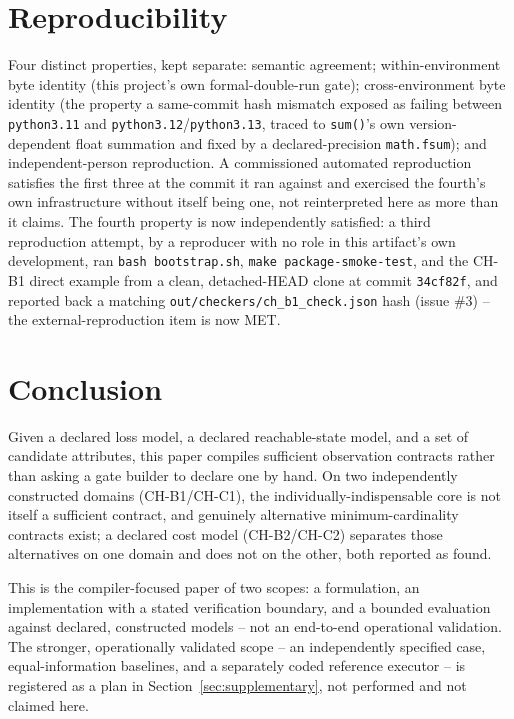 \documentclass[11pt,a4paper]{article}
\theoremstyle{definition}
\begin{document}
\section{Reproducibility}
\label{sec:reproducibility}

Four distinct properties, kept separate: semantic agreement; within-environment byte identity (this project's own formal-double-run gate); cross-environment byte identity (the property a same-commit hash mismatch exposed as failing between \texttt{python3.11} and \texttt{python3.12}/\texttt{python3.13}, traced to \texttt{sum()}'s own version-dependent float summation and fixed by a declared-precision \texttt{math.fsum}); and independent-person reproduction. A commissioned automated reproduction satisfies the first three at the commit it ran against and exercised the fourth's own infrastructure without itself being one, not reinterpreted here as more than it claims. The fourth property is now independently satisfied: a third reproduction attempt, by a reproducer with no role in this artifact's own development, ran \texttt{bash bootstrap.sh}, \texttt{make package-smoke-test}, and the CH-B1 direct example from a clean, detached-HEAD clone at commit \texttt{34cf82f}, and reported back a matching \texttt{out/checkers/ch\_b1\_check.json} hash (issue \#3) -- the external-reproduction item is now MET.

\section{Conclusion}
\label{sec:conclusion}

Given a declared loss model, a declared reachable-state model, and a set of candidate attributes, this paper compiles sufficient observation contracts rather than asking a gate builder to declare one by hand. On two independently constructed domains (CH-B1/CH-C1), the individually-indispensable core is not itself a sufficient contract, and genuinely alternative minimum-cardinality contracts exist; a declared cost model (CH-B2/CH-C2) separates those alternatives on one domain and does not on the other, both reported as found.

This is the compiler-focused paper of two scopes: a formulation, an implementation with a stated verification boundary, and a bounded evaluation against declared, constructed models -- not an end-to-end operational validation. The stronger, operationally validated scope -- an independently specified case, equal-information baselines, and a separately coded reference executor -- is registered as a plan in Section~\ref{sec:supplementary}, not performed and not claimed here.
\end{document}
